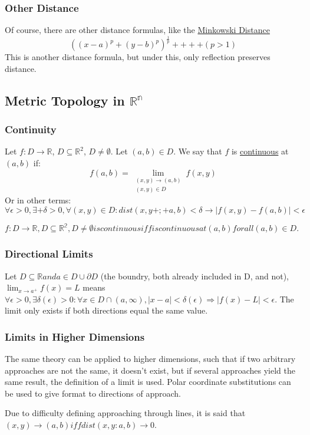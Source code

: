 \subsubsection{Other Distance}
Of course, there are other distance formulas, like the \underline{Minkowski Distance}
$$((x - a)^p + (y - b)^p)^{\frac{1}{p}} ++++ (p > 1)$$
This is another distance formula, but under this, only reflection preserves
distance.

\subsection{Metric Topology in $\mathbb{R^n}$}
\subsubsection{Continuity}
Let $f: D\to\mathbb{R}$, $D\subseteq\mathbb{R}^2$, $D\neq\emptyset$. Let $(a, b)\in D$. We say that $f$ is \underline{continuous} at $(a, b)$ if:
$$f(a, b) = \lim_{\substack{(x, y)\to(a,b)\\(x, y)\in D}} f(x, y)$$
Or in other terms:
$$\forall \epsilon > 0, \exists+ \delta>0, \forall (x, y)\in D: dist(x,
y+;+a,b) < \delta \to |f(x,y) - f(a,b)| < \epsilon$$

$f:D \to \mathbb{R}, D \subseteq \mathbb{R^2}, D \neq \emptyset is continuous if f is continuous at (a, b) for all (a, b) \in D.$

\subsubsection{Directional Limits}
Let $D \subseteq \mathbb{R} and a \in D \cup \partial D$ (the boundry, both already included in D, and not), $\lim_{x \to a^+} f(x) = L$ means $\forall \epsilon > 0, \exists \delta(\epsilon) > 0: \forall x \in D \cap (a, \infty), |x-a| < \delta(\epsilon) \Rightarrow |f(x) - L| < \epsilon$. The limit only exists if both directions equal the same value.

\subsubsection{Limits in Higher Dimensions}
The same theory can be applied to higher dimensions, such that if two arbitrary approaches are not the same, it doesn't exist, but if several approaches yield the same result, the definition of a limit is used. Polar coordinate substitutions can be used to give format to directions of approach.

Due to difficulty defining approaching through lines, it is said that $(x, y) \to (a, b) iff dist(x, y: a, b) \to 0$.

